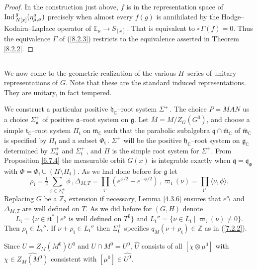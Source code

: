 \documentclass{conm-p-l}
\renewcommand{\gg}{\mathfrak{g}}
\newcommand{\gq}{\mathfrak{q}}
\def\ga{\mathfrak{a}}
\def\gg{\mathfrak{g}}
\def\gh{\mathfrak{h}}
\def\gm{\mathfrak{m}}
\def\gq{\mathfrak{q}}
\def\gt{\mathfrak{t}}
\def\Ind{{\rm Ind\,}}
\def\C{\mathbb{C}}
\def\E{\mathbb{E}}
\def\Z{\mathbb{Z}}
\begin{document}
\begin{proof}
In the construction just above, $f$ is in the representation space of
$\Ind_{N{[x]}}^g(\eta^q_{\mu,\sigma})$ precisely when almost every $f(g)$ 
is annihilated by the Hodge--Kodaira--Laplace operator of 
$\E_\mu \to S_{[x]}$\,.  That is equivalent to $\square\,\Gamma(f) = 0$.
Thus the equivalence $\Gamma$ of (\ref{8.2.3}) restricts to the equivalence
asserted in Theorem \ref{8.2.2}.
\end{proof}

\subsection{}\label{ssec8c}\setcounter{equation}{0}
We now come to the geometric realization of the various $H$--series
of unitary representations of $G$.  Note that these are the standard
induced representations.  They are unitary, in fact tempered.

We construct a particular positive $\gh_\C$--root system $\Sigma^+$\,.
The choice $P = MAN$ us a choice $\Sigma_\ga^+$ of positive $\ga$--root
system on $\gg$.  Let $\overline{M} = M/Z_G(G^0)$, and choose a simple
$\gt_\C$--root system $\Pi_\gt$ on $\gm_\C$ such that the parabolic
subalgebra $\gq\cap \overline{\gm}_\C$ of $\overline{\gm}_\C$ is 
specified by $\Pi_\gt$ and a subset $\Phi_\gt$\,.  $\Sigma^+$ will be
the positive $\gh_\C$--root system on $\gg_\C$ determined by $\Sigma_\ga^+$
and $\Sigma_\gt^+$\,, and $\Pi$ is the simple root system for $\Sigma^+$.
From Proposition \ref{6.7.4} the measurable orbit $G(x)$ is integrable
exactly when $\gq = \gq_\Phi$ with 
$\Phi = \Phi_\gt \cup (\Pi \setminus \Pi_\gt)$.  As we had done before 
for $\gg$ let
$$
\rho_\gt = \tfrac{1}{2}\sum_{\phi\in\Sigma_\gt^+} \phi\,,
\Delta_{M,T} = \prod_{\gt^+}(e^{\phi/2}-e^{-\phi/2})\,,
\varpi_\gt(\nu) = \prod_{\gt^+} \langle\nu,\phi\rangle.
$$
Replacing $G$ be a $\Z_2$ extension if necessary, Lemma \ref{4.3.6}
ensures that $e^{\rho_\gt}$ and $\Delta_{M,T}$ are well defined on $T$.
As we did before for $(G,H)$ denote
\begin{equation}\label{8.3.2}
L_\gt = \{\nu\in i\gt^*\mid e^\nu \text{ is well defined on } T^0\} \text{ and }
L_\gt'' = \{\nu \in L_\gt \mid \varpi_\gt(\nu) \ne 0\}.
\end{equation}
Then $\rho_\gt \in L_\gt''$.  If $\nu+\rho_\gt \in L_\gt''$ then $\Sigma_\gt^+$ 
specifies $q_M(\nu+\rho_\gt) \in \Z$ as in (\ref{7.2.2}).

Since $U = Z_M(M^0)U^0$ and $U\cap M^0 = U^0$, $\widehat{U}$ consists of all
$[\chi\otimes\mu^0]$ with $\chi \in \widehat{Z_M(M^0)}$ consistent with
$[\mu^0] \in \widehat{U^0}$. 
\end{document}
